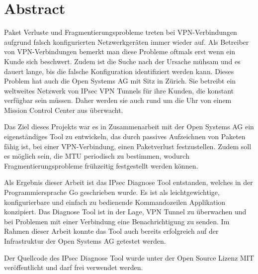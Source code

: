 
\chapter*{Abstract}

Paket Verluste und Fragmentierungsprobleme treten bei \ac{VPN}-Verbindungen aufgrund falsch konfigurierten Netzwerkgeräten immer wieder auf. Als Betreiber von \ac{VPN}-Verbindungen bemerkt man diese Probleme oftmals erst wenn ein Kunde sich beschwert. Zudem ist die Suche nach der Ursache mühsam und es dauert lange, bis die falsche Konfiguration identifiziert werden kann.
Dieses Problem hat auch die Open Systems AG mit Sitz in Zürich. Sie betreibt ein weltweites Netzwerk von \ac{IPsec} \ac{VPN} Tunnels für ihre Kunden, die konstant verfügbar sein müssen. Daher werden sie auch rund um die Uhr von einem Mission Control Center aus überwacht.

Das Ziel dieses Projekts war es in Zusammenarbeit mit der Open Systems AG ein eigenständiges Tool zu entwickeln, das durch passives Aufzeichnen von Paketen fähig ist, bei einer \ac{VPN}-Verbindung, einen Paketverlust festzustellen.
Zudem soll es möglich sein, die \ac{MTU} periodisch zu bestimmen, wodurch Fragmentierungsprobleme frühzeitig festgestellt werden können.

Als Ergebnis dieser Arbeit ist das \ac{IPsec} Diagnose Tool entstanden, welches in der Programmiersprache Go geschrieben wurde. Es ist als leichtgewichtige, konfigurierbare und einfach zu bedienende Kommandozeilen Applikation konzipiert. Das Diagnose Tool ist in der Lage, \ac{VPN} Tunnel zu überwachen und bei Problemen mit einer Verbindung eine Benachrichtigung zu senden. Im Rahmen dieser Arbeit konnte das Tool auch bereits erfolgreich auf der Infrastruktur der Open Systems AG getestet werden.

Der Quellcode des \ac{IPsec} Diagnose Tool wurde unter der Open Source Lizenz MIT veröffentlicht und darf frei verwendet werden.